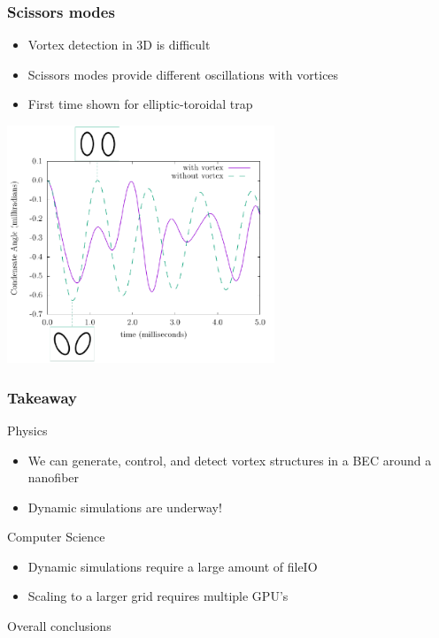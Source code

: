 \documentclass{beamer}
\begin{document}
\begin{frame}
\frametitle{Scissors modes}
\begin{itemize}
\item Vortex detection in 3D is difficult
\item Scissors modes provide different oscillations with vortices
\item First time shown for elliptic-toroidal trap
\end{itemize}
\begin{center}
\includegraphics[width=0.6\textwidth]{../data/3d/scissors_plot.pdf}
\end{center}
\end{frame}

\begin{frame}
\frametitle{Takeaway}
Physics
\begin{itemize}
\item We can generate, control, and detect vortex structures in a BEC around a nanofiber
\item Dynamic simulations are underway!
\end{itemize}
Computer Science
\begin{itemize}
\item Dynamic simulations require a large amount of fileIO
\item Scaling to a larger grid requires multiple GPU's
\end{itemize}
\end{frame}


\begin{frame}
\center \huge Overall conclusions
\end{frame}
\end{document}
